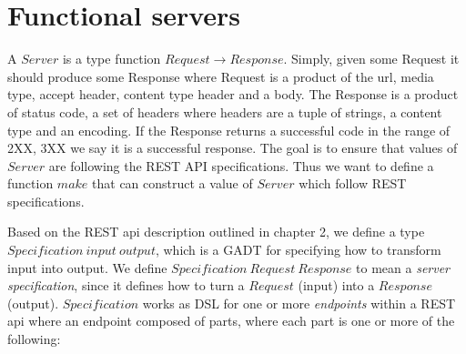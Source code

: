 
\section{Functional servers}

A $Server$ is a type function $Request \rightarrow Response$. Simply, given some
Request it should produce some Response where Request is a product of the url,
media type, accept header, content type header and a body.  The Response is a
product of status code, a set of headers where headers are a tuple of strings, a
content type and an encoding. If the Response returns a successful code in the
range of 2XX, 3XX we say it is a successful response. The goal is to ensure that
values of $Server$ are following the REST API specifications.  Thus we want to
define a function $make$ that can construct a value of $Server$ which follow
REST specifications.

Based on the REST api description outlined in chapter 2, we define a type
$Specification\ input\ output$, which is a GADT for specifying how to transform
input into output. We define $Specification\ Request\ Response$ to mean a
\textit{server specification}, since it defines how to turn a $Request$ (input)
into a $Response$ (output). $Specification$ works as DSL for one or more
\textit{endpoints} within a REST api where an endpoint composed of parts, where
each part is one or more of the following:

